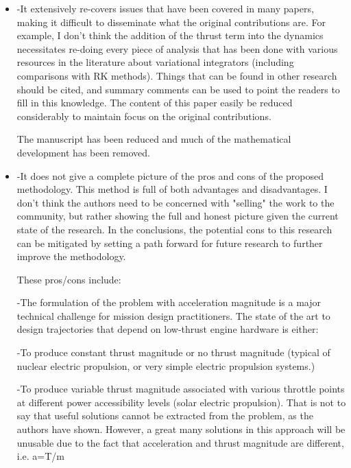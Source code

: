 \documentclass[11pt]{article}
\begin{document}
\begin{itemize}
    \item 
        \begin{itshape}
-It extensively re-covers issues that have been covered in many papers, making it difficult to disseminate what the original contributions are.  For example, I don't think the addition of the thrust term into the dynamics necessitates re-doing every piece of analysis that has been done with various resources in the literature about variational integrators (including comparisons with RK methods).  Things that can be found in other research should be cited, and summary comments can be used to point the readers to fill in this knowledge.  The content of this paper easily be reduced considerably to maintain focus on the original contributions.
    \end{itshape}

The manuscript has been reduced and much of the mathematical development has been removed. 

\item
    \begin{itshape}
-It does not give a complete picture of the pros and cons of the proposed methodology.  This method is full of both advantages and disadvantages.  I don't think the authors need to be concerned with "selling" the work to the community, but rather showing the full and honest picture given the current state of the research.  In the conclusions, the potential cons to this research can be mitigated by setting a path forward for future research to further improve the methodology.

These pros/cons include:

-The formulation of the problem with acceleration magnitude is a major technical challenge for mission design practitioners.  The state of the art to design trajectories that depend on low-thrust engine hardware is either:

-To produce constant thrust magnitude or no thrust magnitude (typical of nuclear electric propulsion, or very simple electric propulsion systems.)

-To produce variable thrust magnitude associated with various throttle points at different power accessibility levels (solar electric propulsion).
That is not to say that useful solutions cannot be extracted from the problem, as the authors have shown.  However, a great many solutions in this approach will be unusable due to the fact that acceleration and thrust magnitude are different, i.e. a=T/m


\end{itshape}
\end{itemize}
\end{document}
